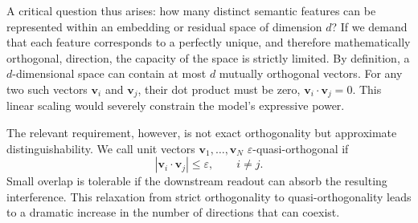 \documentclass[%
  reprint,
  superscriptaddress,
  showpacs,
  showkeys,
  amsmath,amssymb,
  pra,
  longbibliography,
  floatfix,
  x11names
]{revtex4-2}
\begin{document}
A critical question thus arises: how many distinct semantic features can be represented within an embedding or residual space of dimension $d$? If we demand that each feature corresponds to a perfectly unique, and therefore mathematically orthogonal, direction, the capacity of the space is strictly limited. By definition, a $d$-dimensional space can contain at most $d$ mutually orthogonal vectors. For any two such vectors $\bm{v}_i$ and $\bm{v}_j$, their dot product must be zero, $\bm{v}_i \cdot \bm{v}_j = 0$. This linear scaling would severely constrain the model's expressive power.

The relevant requirement, however, is not exact orthogonality but approximate distinguishability. We call unit vectors $\bm{v}_1,\ldots,\bm{v}_N$ $\varepsilon$-quasi-orthogonal if
\begin{equation}
 |\bm{v}_i \cdot \bm{v}_j| \leq \varepsilon,
 \qquad i\neq j .
\end{equation}
Small overlap is tolerable if the downstream readout can absorb the resulting interference. This relaxation from strict orthogonality to quasi-orthogonality leads to a dramatic increase in the number of directions that can coexist.
\end{document}
